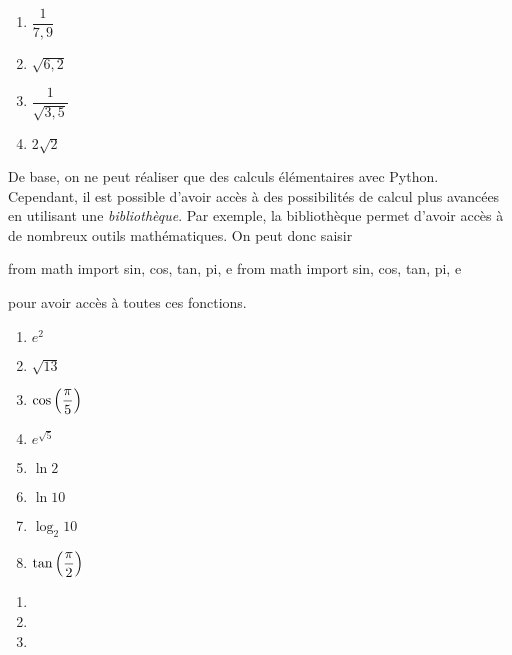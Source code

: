 \begin{multicols}{2}
  \begin{enumerate}[label=\emph{\alph*)}]
    \item $\dfrac{1}{7,9}$
    \item $\sqrt{6,2}$
    \item $\dfrac{1}{\sqrt{3,5}}$
    \item $2\sqrt{2}$
  \end{enumerate}
\end{multicols}
De base, on ne peut réaliser que des calculs élémentaires avec Python. Cependant, il est possible d'avoir accès à des possibilités de calcul plus avancées en utilisant une \emph{bibliothèque}. 
Par exemple, la bibliothèque  permet d'avoir accès à de nombreux outils mathématiques. 
On peut donc saisir
\begin{pyverbatim}
from math import sin, cos, tan, pi, e
from math import sin, cos, tan, pi, e 
\end{pyverbatim}
pour avoir accès à toutes ces fonctions. \\

\begin{multicols}{2}
  \begin{enumerate}[label=\emph{\alph*)}]
    \item $e^2$
    \item $\sqrt{13}$
    \item $\cos\left( \dfrac{\pi}{5}\right)$
    \item $e^{\sqrt{5}}$
    \item $\ln 2$
    \item $\ln 10$
    \item $\log_{2} 10$
    \item $\tan\left( \dfrac{\pi}{2}\right)$
  \end{enumerate}
\end{multicols}


\begin{multicols}{2}
  \begin{enumerate}[label=\emph{\alph*)}]
    \item {}
    \item {}
    \item {}
  \end{enumerate}
\end{multicols}

